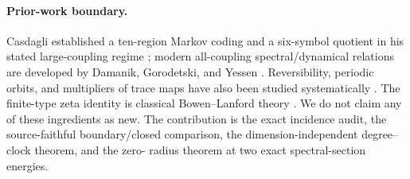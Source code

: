 \paragraph{Prior-work boundary.}
Casdagli established a ten-region Markov coding and a six-symbol quotient in
his stated large-coupling regime \citep{casdagli1986}; modern all-coupling
spectral/dynamical relations are developed by Damanik, Gorodetski, and Yessen
\citep{damanik2016}.  Reversibility, periodic orbits, and multipliers of trace
maps have also been studied systematically \citep{roberts1994}.  The
finite-type zeta identity is classical Bowen--Lanford theory
\citep{bowen1970}.  We do not claim any of these ingredients as new.  The
contribution is the exact incidence audit, the source-faithful boundary/closed
comparison, the dimension-independent degree--clock theorem, and the zero-
radius theorem at two exact spectral-section energies.
